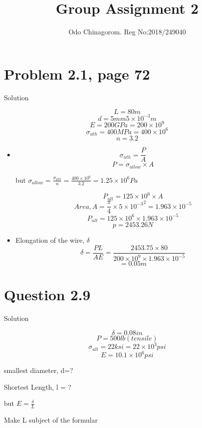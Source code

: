 \documentclass{article}
\title{Group Assignment 2}
\author{Odo Chinagorom. Reg  No:2018/249040 }
\begin{document}
\maketitle
\newpage

\section*{Problem 2.1, page 72}
\begin{center} Solution \end{center}
\[L = 80m\]
\[d = 5mm 5 \times 10^{-3}m\]
\[E = 200GPa = 200 \times 10^{9}\]
\[\sigma_{uth} = 400MPa = 400 \times 10^{6}\]
\[ n = 3.2\]
\begin{itemize}
\item \[\sigma_{uth} = \frac{P}{A}\]
\[P = \sigma_{allow} \times A\]
\begin{center} but $\sigma_{allow} = \frac{\sigma_{uth}}{n} = \frac{400 \times 10^{6}}{3.2} = 1.25 \times 10^{6}Pa$\end{center}
\[P_{ult} = 125 \times 10^{6} \times A\]
\[Area, A=\frac{\pi}{4} \times{5 \times 10^{-3}}^{2} = 1.963 \times 10^{-5}\]
\[P_{ult} = 125\times 10^{6} \times 1.963 \times 10 ^{-5}\]
\[p = 2453.26N\]
\item Elongation  of the wire, $\delta$
\[\delta = \frac{PL}{AE} = \frac{2453.75 \times 80}{200\times10^{9}\times1.963\times10^{-5}}\]
\[=0.05m\]
\end{itemize}


\section*{Question 2.9}
\begin{center} Solution\end{center}
\[ \delta = 0.08in\]
\[P = 500lb(tensile)\]
\[\sigma_{ult} = 22ksi = 22 \times 10^{3}psi\]
\[E = 10.1 \times 10^{6} psi\]
\begin{center}smallest diameter, d=?\end{center}
\begin{center} Shortest Length, l = ? \end{center}
\begin{center} but $ E = \frac{\delta}{L}$\end{center}
\begin{center} Make L subject of the formular\end{center}
\end{document}
